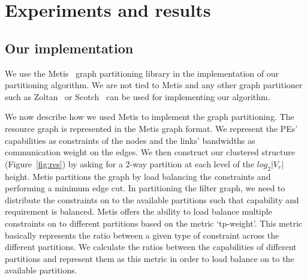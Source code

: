 \section{Experiments and results}
\label{sec:experiments-results}



\subsection{Our implementation}
\label{sec:our-implementation}

We use the Metis~\cite{gkar95} graph partitioning library in the implementation
of our partitioning algorithm. We are not tied to Metis and any other graph
partitioner such as Zoltan~\cite{kdev09} or Scotch~\cite{cche08} can be
used for implementing our algorithm.

We now describe how we used Metis to implement the graph partitioning.
The resource graph is represented in the Metis graph format. We
represent the PEs' capabilities as constraints of the nodes and the
links' bandwidths as communication weight on the edges. We then
construct our clustered structure (Figure~\ref{fig:res}) by asking for a
2-way partition at each level of the $log_2|V_r|$ height. Metis
partitions the graph by load balancing the constraints and performing a
minimum edge cut.  In partitioning the filter graph, we need to distribute
the constraints on to the available partitions such that capability and requirement
is balanced. Metis offers the ability
to load balance multiple constraints on to different partitions based on
the metric \mbox{`tp-weight'}. This metric basically represents the ratio between
a given type of constraint across the different partitions. We calculate the ratios
between the capabilities of different partitions and represent them as this metric
in order to load balance on to the available partitions.

